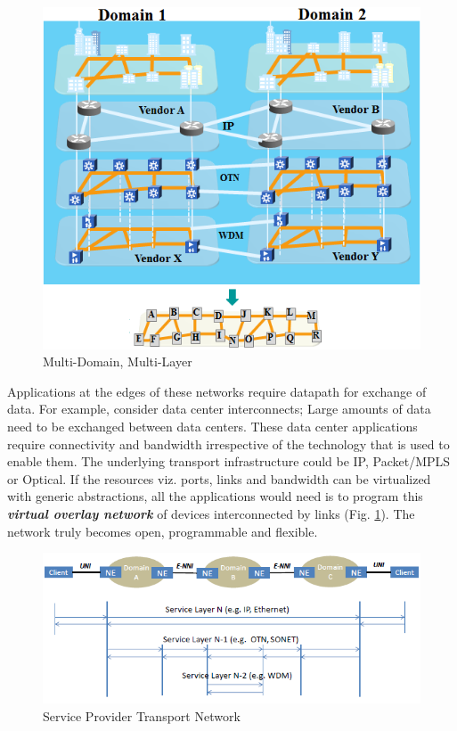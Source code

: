 \documentclass{sig-alternate-2013}
\begin{document}
\begin{figure}[htb]
	\centering
	\includegraphics[scale=0.50]{MultiDomainLayer.png}
	\caption{Multi-Domain, Multi-Layer}
	\label{fig:MDL}
	\end{figure}
	
	Applications at the edges of these networks require datapath for exchange of data. For example, consider data
	center interconnects; Large amounts of data need to be exchanged between data centers. These data center
	applications require connectivity and bandwidth irrespective of the technology that is used to enable
	them. The underlying transport infrastructure could be IP, Packet/MPLS or Optical. If the resources viz.
	ports, links and bandwidth can be virtualized with generic abstractions, all the applications would need
	is to program this \emph{\bf virtual overlay network} of devices interconnected by links (Fig.
	\ref{fig:MDL}). The network truly becomes open, programmable and flexible. \\
		
	\begin{figure}[htb]
	\centering
	\includegraphics[scale=0.50]{MLwoOF.png}
	\caption{Service Provider Transport Network}
	\label{fig:MLwoOF}
	\end{figure}
\end{document}
